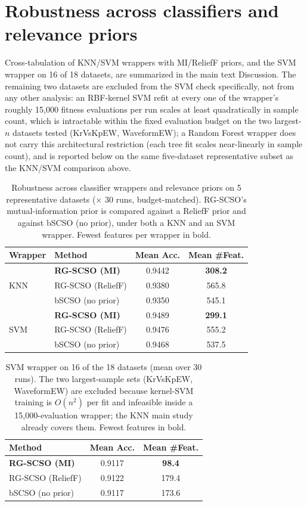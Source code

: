 \documentclass[9pt]{article}
\begin{document}
\FloatBarrier
\section{Robustness across classifiers and relevance priors}
Cross-tabulation of KNN/SVM wrappers with MI/ReliefF priors, and the SVM
wrapper on 16 of 18 datasets, are summarized in
the main text Discussion. The remaining two datasets are excluded from the
SVM check specifically, not from any other analysis: an RBF-kernel SVM
refit at every one of the wrapper's roughly 15{,}000 fitness evaluations
per run scales at least quadratically in sample count, which is intractable
within the fixed evaluation budget on the two largest-$n$ datasets tested
(KrVsKpEW, WaveformEW); a Random Forest wrapper does not carry this
architectural restriction (each tree fit scales near-linearly in sample
count), and is reported below on the same five-dataset representative
subset as the KNN/SVM comparison above.

\begin{table}[t]
\centering
\caption{Robustness across classifier wrappers and relevance priors on 5 representative datasets ($\times$ 30 runs, budget-matched). RG-SCSO's mutual-information prior is compared against a ReliefF prior and against bSCSO (no prior), under both a KNN and an SVM wrapper. Fewest features per wrapper in bold.}
\label{tab:robustness}
\footnotesize
\begin{tabular}{llcc}
\toprule
Wrapper & Method & Mean Acc. & Mean \#Feat. \\
\midrule
\multirow{3}{*}{KNN} & \textbf{RG-SCSO (MI)} & 0.9442 & \textbf{308.2} \\
 & RG-SCSO (ReliefF) & 0.9380 & 565.8 \\
 & bSCSO (no prior) & 0.9350 & 545.1 \\
\midrule
\multirow{3}{*}{SVM} & \textbf{RG-SCSO (MI)} & 0.9489 & \textbf{299.1} \\
 & RG-SCSO (ReliefF) & 0.9476 & 555.2 \\
 & bSCSO (no prior) & 0.9468 & 537.5 \\
\bottomrule
\end{tabular}
\end{table}

\begin{table}[t]
\centering
\caption{SVM wrapper on 16 of the 18 datasets (mean over 30 runs). The two largest-sample sets (KrVsKpEW, WaveformEW) are excluded because kernel-SVM training is $O(n^2)$ per fit and infeasible inside a 15{,}000-evaluation wrapper; the KNN main study already covers them. Fewest features in bold.}
\label{tab:svm16}
\footnotesize
\begin{tabular}{lcc}
\toprule
Method & Mean Acc. & Mean \#Feat. \\
\midrule
\textbf{RG-SCSO (MI)} & 0.9117 & \textbf{98.4} \\
RG-SCSO (ReliefF) & 0.9122 & 179.4 \\
bSCSO (no prior) & 0.9117 & 173.6 \\
\bottomrule
\end{tabular}
\end{table}
\end{document}
